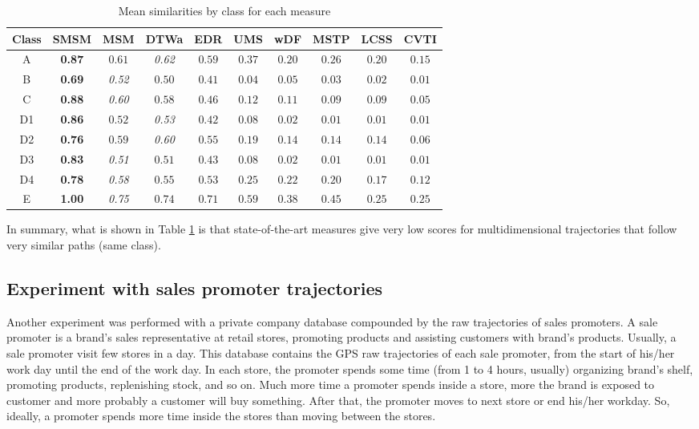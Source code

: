 \documentclass[12pt]{article}
\begin{document}
\begin{table}[ht!]
\footnotesize
  \centering
  \begin{tabular}{|c|c|c|c|c|c|c|c|c|c|}
  	\hline
 Class & SMSM & MSM & DTWa & EDR & UMS & wDF & MSTP & LCSS & CVTI \\
  	\hline
 A & \textbf{0.87} & $0.61$ & \textit{0.62} & $ 0.59$ & $0.37$ & $0.20$& $0.26$ & $0.20$ & $0.15$  \\
 B & \textbf{0.69} & \textit{0.52} & $0.50$ & $ 0.41$ & $0.04$ & $0.05$& $0.03$ & $0.02$ & $0.01$ \\
 C & \textbf{0.88} & \textit{0.60} & $0.58$ & $ 0.46$ & $0.12$ & $0.11$& $0.09$ & $0.09$ & $0.05$ \\
D1 & \textbf{0.86} & $0.52$ & \textit{0.53} & $ 0.42$ & $0.08$ & $0.02$& $0.01$ & $0.01$ & $0.01$ \\
D2 & \textbf{0.76} & $0.59$ & \textit{0.60} & $ 0.55$ & $0.19$ & $0.14$& $0.14$ & $0.14$ & $0.06$ \\
D3 & \textbf{0.83} & \textit{0.51} & $0.51$ & $ 0.43$ & $0.08$ & $0.02$& $0.01$ & $0.01$ & $0.01$ \\
D4 & \textbf{0.78} & \textit{0.58} & $0.55$ & $ 0.53$ & $0.25$ & $0.22$& $0.20$ & $0.17$ & $0.12$ \\
E  & \textbf{1.00} & \textit{0.75} & $0.74$ & $ 0.71$ & $0.59$ & $0.38$& $0.45$ & $0.25$ & $0.25$ \\
    \hline
  \end{tabular}
  \caption{Mean similarities by class for each measure}
  \label{tab:geolife_similaritymeans}
\end{table}

In summary, what is shown in Table \ref{tab:geolife_similaritymeans} is that state-of-the-art measures give very low scores for multidimensional trajectories that follow very similar paths (same class).


\subsection{Experiment with sales promoter trajectories}
Another experiment was performed with a private company database compounded by the raw trajectories of sales promoters. A sale promoter is a brand's sales representative at retail stores, promoting products and assisting customers with brand's products. Usually, a sale promoter visit few stores in a day. This database contains the GPS raw trajectories of each sale promoter, from the start of his/her work day until the end of the work day.
In each store, the promoter spends some time (from 1 to 4 hours, usually) organizing brand's shelf, promoting products, replenishing stock, and so on. Much more time a promoter spends inside a store, more the brand is exposed to customer and more probably a customer will buy something. After that, the promoter moves to next store or end his/her workday. So, ideally, a promoter spends more time inside the stores than moving between the stores.
\end{document}
